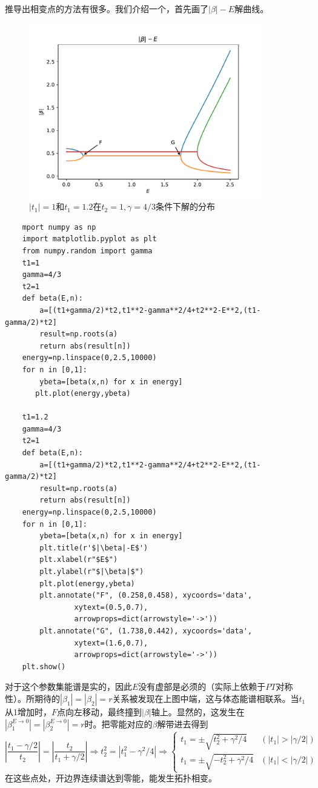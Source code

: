 \documentclass{article}
\begin{document}
推导出相变点的方法有很多。我们介绍一个，首先画了$|\beta|-E$解曲线。
\begin{figure}[h]
    \centering
    \includegraphics[width=4in]{Figure_5.pdf}
    \caption{$|t_1|=1$和$t_1=1.2$在$t_2=1,\gamma=4/3$条件下解的分布}
\end{figure}
\begin{lstlisting}
    mport numpy as np
    import matplotlib.pyplot as plt
    from numpy.random import gamma
    t1=1
    gamma=4/3
    t2=1
    def beta(E,n):
        a=[(t1+gamma/2)*t2,t1**2-gamma**2/4+t2**2-E**2,(t1-gamma/2)*t2]
        result=np.roots(a)
        return abs(result[n])
    energy=np.linspace(0,2.5,10000)
    for n in [0,1]:
        ybeta=[beta(x,n) for x in energy]
       plt.plot(energy,ybeta)

    t1=1.2
    gamma=4/3
    t2=1
    def beta(E,n):
        a=[(t1+gamma/2)*t2,t1**2-gamma**2/4+t2**2-E**2,(t1-gamma/2)*t2]
        result=np.roots(a)
        return abs(result[n])
    energy=np.linspace(0,2.5,10000)
    for n in [0,1]:
        ybeta=[beta(x,n) for x in energy]
        plt.title(r'$|\beta|-E$') 
        plt.xlabel(r"$E$") 
        plt.ylabel(r"$|\beta|$")
        plt.plot(energy,ybeta)
        plt.annotate("F", (0.258,0.458), xycoords='data',
                xytext=(0.5,0.7), 
                arrowprops=dict(arrowstyle='->')) 
        plt.annotate("G", (1.738,0.442), xycoords='data',
                xytext=(1.6,0.7), 
                arrowprops=dict(arrowstyle='->')) 
    plt.show()
\end{lstlisting}
对于这个参数集能谱是实的，因此$E$没有虚部是必须的（实际上依赖于$PT$对称性）。所期待的$|\beta_1|=|\beta_2|=r$关系被发现在上图中端，这与体态能谱相联系。当$t_1$从1增加时，$F$点向左移动，最终撞到$|\beta|$轴上。显然的，这发生在$|\beta_1^{E\to0}|=|\beta_2^{E\to0}|=r$时。把零能对应的$\beta$解带进去得到
\begin{equation}
    |\frac{t_1-\gamma/2}{t_2}|=|\frac{t_2}{t_1+\gamma/2}|\Rightarrow t_2^2=|t_1^2-\gamma^2/4|\Rightarrow \begin{cases}
        t_1=\pm\sqrt{t_2^2+\gamma^2/4}&(|t_1|>|\gamma/2|)\\
        t_1=\pm\sqrt{-t_2^2+\gamma^2/4}&(|t_1|<|\gamma/2|)
    \end{cases}
\end{equation}
在这些点处，开边界连续谱达到零能，能发生拓扑相变。
\end{document}
